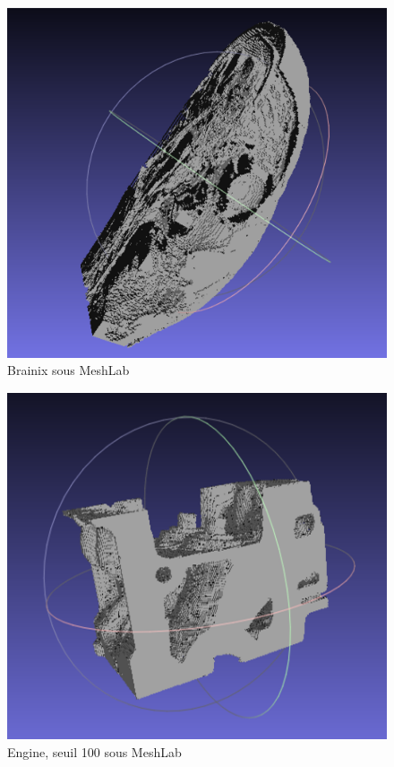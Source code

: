 \documentclass[a4paper,11pt]{article}
\begin{document}
\begin{figure}[H]
 \center
\includegraphics[scale=0.7]{brainix.png}
\caption{Brainix sous MeshLab}
\end{figure}

\begin{figure}[H]
 \center
\includegraphics[scale=0.7]{egine_100_meshlab.png}
\caption{Engine, seuil 100 sous MeshLab}
\end{figure}
\end{document}
